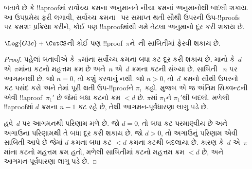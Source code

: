 \documentclass[../../../include/open-logic-section]{subfiles}
\begin{document}


 બતાવે છે કે
!!a{proof}માં સર્વોચ્ચ ક્રમના \CutCS{}
અનુમાનને નીચા ક્રમનાં \CutCS{} અનુમાનોથી
બદલી શકાય.
આ ઉપપ્રમેય ફરી લગાવી,
સર્વોચ્ચ ક્રમના~\CutCS{} પર સમાપ્ત
થતી સૌથી ઉપરની ઉપ-!!{proof}s પર
ક્રમશઃ પ્રક્રિયા કરીને, કોઈ પણ
!!a{proof}માંથી ગમે તેટલા \CutCS{}
અનુમાનો દૂર કરી શકાય છે.

\begin{thm}
$\Log{G3c} + \CutCS$ની કોઈ પણ
!!{proof}~$\pi$ને~ની
સાબિતીમાં ફેરવી શકાય છે.
\end{thm}

\begin{proof}
  પહેલાં બતાવીએ કે~$\pi$માંના સર્વોચ્ચ
  ક્રમના બધા કટ દૂર કરી શકાય છે.
  માનો કે~$d$ એ~$\pi$માંના કટનો
  મહત્તમ ક્રમ છે અને~$n$ એ~$d$
  ક્રમના કટની સંખ્યા છે. સાબિતી
  ~$n$ પર આગમનથી છે.
  જો $n=0$, તો કશું કરવાનું નથી.
  જો $n>0$, તો~$d$ ક્રમનો
  સૌથી ઉપરનો કટ પસંદ કરો અને
  તેમાં પૂરી થતી ઉપ-!!{proof}ને
  $\pi_1$ કહો.
   મુજબ
  એ જ અંતિમ સિક્વન્ટની એવી
  !!a{proof}~$\pi_1'$ છે જેમાં
  બધા કટનો ક્રમ $<d$ છે.
  $\pi$માં $\pi_1$ને $\pi_1'$થી
  બદલો. મળેલી !!a{proof}માં
  $d$ ક્રમના $n-1$ કટ રહે છે,
  તેથી આગમન-પૂર્વધારણા લાગુ પડે છે.

  હવે~$d$ પર આગમનથી પરિણામ મળે છે.
  જો $d=0$, તો બધા કટ પરમાણ્વીય છે
  અને અગાઉના પરિણામથી તે બધા
  દૂર કરી શકાય છે. જો $d>0$,
  તો અગાઉનું પરિણામ એવી સાબિતી આપે
  છે જેમાં $d$ ક્રમના બધા કટ
  $<d$ ક્રમના કટથી બદલાયા છે.
  કારણ કે~$d$ એ~$\pi$માંના કટનો
  મહત્તમ ક્રમ હતો, મળેલી સાબિતીમાં
  કટનો મહત્તમ ક્રમ $<d$ છે,
  અને આગમન-પૂર્વધારણા લાગુ પડે છે.
\end{proof}
\end{document}
